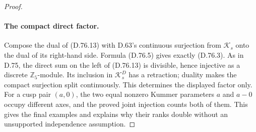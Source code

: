 \begin{proof}
\paragraph{The compact direct factor.}
Compose the dual of (D.76.13) with D.63's continuous
surjection from \(\mathcal K_s\) onto the dual of its
right-hand side. Formula (D.76.5) gives exactly (D.76.3).
As in D.75, the direct sum on the left of (D.76.13) is
divisible, hence injective as a discrete \(\mathbb Z_5\)-module.
Its inclusion in \(\mathcal K_s^D\) has a retraction;
duality makes the compact surjection split continuously.
This determines the displayed factor only.
For a cusp pair \((a,0)\), the two equal nonzero Kummer
parameters \(a\) and \(a-0\) occupy different axes, and
the proved joint injection counts both of them.
This gives the final examples and explains why their ranks
double without an unsupported independence assumption.
\end{proof}
